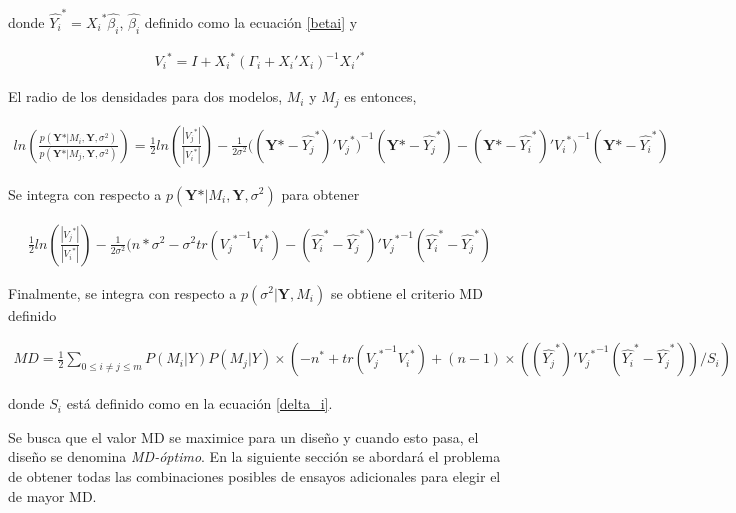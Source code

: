 \noindent donde $\hat{{Y_i}}^{*} = {X_i}^{*} \hat{\beta_i}$, $\hat{\beta_i}$ definido como la ecuación \ref{betai} y 

\begin{equation*}
	\begin{aligned}
	{V_i}^{*} = I + {X_i}^{*}(\Gamma_i + X_i'X_i)^{-1} {X_i'}^{*}
	\end{aligned}
\end{equation*}

El radio de los densidades para dos modelos, $M_i$ y $M_j$ es entonces, 

\begin{equation*}
	\begin{aligned}
		ln(\frac{p(\textbf{Y*} | M_i, \textbf{Y}, \sigma^{2})}{p(\textbf{Y*} | M_j, \textbf{Y}, \sigma^{2})}) = 
		\frac{1}{2} ln(\frac{|{V_j}^{*}|}{|{V_i}^{*}|}) - \frac{1}{2 \sigma^{2}} ((\textbf{Y*} - \hat{{Y_j}}^{*})' {{V_j}^{*})}^{-1}(\textbf{Y*} - \hat{{Y_j}}^{*}) - (\textbf{Y*} - \hat{{Y_i}}^{*})'{{V_i}^{*})}^{-1}(\textbf{Y*} - \hat{{Y_i}}^{*})
	\end{aligned}
\end{equation*}

Se integra con respecto a $p(\textbf{Y*} | M_i, \textbf{Y}, \sigma^{2})$ para obtener

\begin{equation*}
	\begin{aligned}
		\frac{1}{2} ln(\frac{|{V_j}^{*}|}{|{V_i}^{*}|}) - \frac{1}{2 \sigma^{2}}(n*\sigma^{2} - \sigma^{2}tr({{V_j}^{*}}^{-1}{V_i}^{*}) - (\hat{{Y_i}}^{*} - \hat{{Y_j}}^{*})'{{V_j}^{*}}^{-1}(\hat{{Y_i}}^{*} - \hat{{Y_j}}^{*})
	\end{aligned}
\end{equation*}

Finalmente, se integra con respecto a $p(\sigma^{2} | \textbf{Y}, M_i)$ se obtiene el criterio MD definido 

\begin{equation} \label{formula_MD}
	\begin{aligned}
		MD = \frac{1}{2} \sum_{0 \leq i \neq j \leq m}  P(M_i | Y)  P(M_j | Y) \times (-n^{*} + tr({{V_j}^{*}}^{-1}{V_i}^{*}) + (n-1) \times ((\hat{{Y_j}}^{*})'{{V_j}^{*}}^{-1}(\hat{{Y_i}}^{*} - \hat{{Y_j}}^{*}))/S_i)
	\end{aligned}
\end{equation}

\noindent donde $S_i$ está definido como en la ecuación \ref{delta_i}. 

Se busca que el valor MD se maximice para un diseño y cuando esto pasa, el diseño se denomina \textit{MD-óptimo}. En la siguiente sección se abordará el problema de obtener todas las combinaciones posibles de ensayos adicionales para elegir el de mayor MD. 


